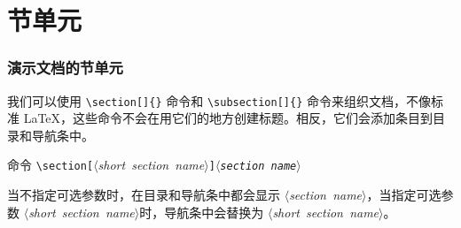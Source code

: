 \documentclass{beamer}
\newcommand\m[1]{\mbox{$\langle${\rmfamily\textit{#1}\/}$\rangle$}}
\newcommand{\marg}[1]{{\tt\string{}\m{#1}{\tt\string}}}
\newcommand{\oarg}[1]{{\tt[}\m{#1}{\tt]}}
\begin{document}
\section{节单元}
\begin{frame}[containsverbatim]
\frametitle{演示文档的节单元}
我们可以使用 \verb|\section[]{}| 命令和 \verb|\subsection[]{}| 命令来组织文档，不像标准 \LaTeX{}，这些命令不会在用它们的地方创建标题。相反，它们会添加条目到目录和导航条中。

\begin{block}{命令}
\verb|\section|\oarg{short section name}\marg{section name}
\end{block}
当不指定可选参数时，在目录和导航条中都会显示 \m{section name}，当指定可选参数 \m{short section name}时，导航条中会替换为 \m{short section name}。
\end{frame}

\end{document}
